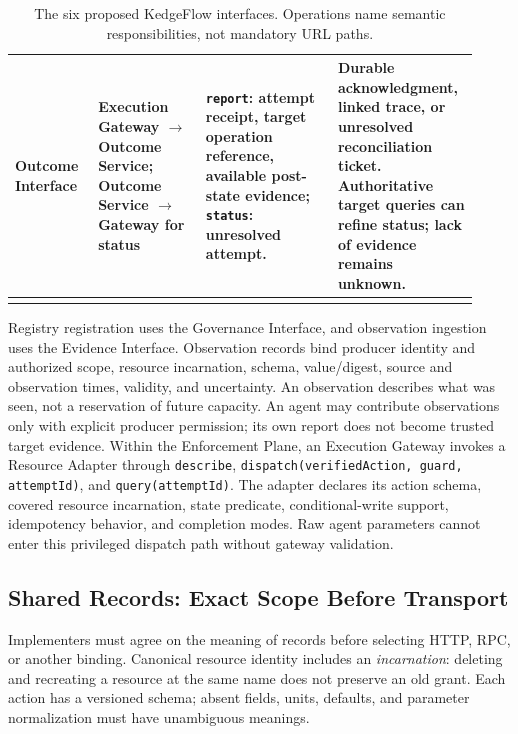\begin{longtable}{L{0.17\linewidth}L{0.22\linewidth}L{0.27\linewidth}L{0.26\linewidth}}
\textbf{Outcome Interface} & Execution Gateway $\rightarrow$ Outcome Service; Outcome Service $\rightarrow$ Gateway for status & \texttt{report}: attempt receipt, target operation reference, available post-state evidence; \texttt{status}: unresolved attempt. & Durable acknowledgment, linked trace, or unresolved reconciliation ticket. Authoritative target queries can refine status; lack of evidence remains unknown.\\
\bottomrule
\caption{The six proposed KedgeFlow interfaces. Operations name semantic responsibilities, not mandatory URL paths.}
\label{tab:southbound-operations}
\end{longtable}
\normalsize

Registry registration uses the Governance Interface, and observation ingestion uses the Evidence Interface. Observation records bind producer identity and authorized scope, resource incarnation, schema, value/digest, source and observation times, validity, and uncertainty. An observation describes what was seen, not a reservation of future capacity. An agent may contribute observations only with explicit producer permission; its own report does not become trusted target evidence. Within the Enforcement Plane, an Execution Gateway invokes a Resource Adapter through \texttt{describe}, \texttt{dispatch(verifiedAction, guard, attemptId)}, and \texttt{query(attemptId)}. The adapter declares its action schema, covered resource incarnation, state predicate, conditional-write support, idempotency behavior, and completion modes. Raw agent parameters cannot enter this privileged dispatch path without gateway validation.

\subsection{Shared Records: Exact Scope Before Transport}
Implementers must agree on the meaning of records before selecting HTTP, RPC, or another binding. Canonical resource identity includes an \emph{incarnation}: deleting and recreating a resource at the same name does not preserve an old grant. Each action has a versioned schema; absent fields, units, defaults, and parameter normalization must have unambiguous meanings.

